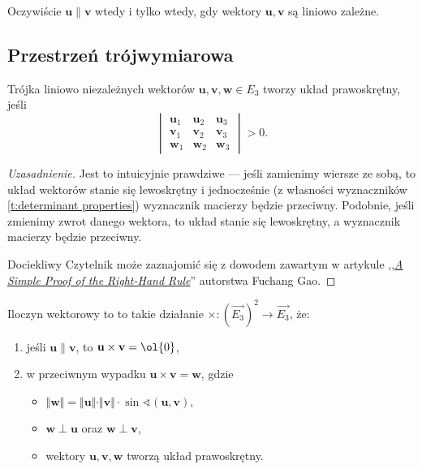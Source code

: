 Oczywiście $\mathbf{u} \parallel \mathbf{v}$ wtedy i tylko wtedy, gdy wektory $\mathbf{u}, \mathbf{v}$ są liniowo zależne.

\subsection{Przestrzeń trójwymiarowa}
\begin{fact}
    Trójka liniowo niezależnych wektorów $\mathbf{u}, \mathbf{v}, \mathbf{w} \in E_3$ tworzy układ prawoskrętny, jeśli
    \[ \begin{vmatrix}
        \mathbf{u}_1 & \mathbf{u}_2 & \mathbf{u}_3 \\
        \mathbf{v}_1 & \mathbf{v}_2 & \mathbf{v}_3 \\
        \mathbf{w}_1 & \mathbf{w}_2 & \mathbf{w}_3
    \end{vmatrix} > 0. \]
\end{fact}
\begin{proof}[Uzasadnienie]
    Jest to intuicyjnie prawdziwe --- jeśli zamienimy wiersze ze sobą, to układ wektorów stanie się lewoskrętny i jednocześnie (z własności wyznaczników \ref{t:determinant properties}) wyznacznik macierzy będzie przeciwny. Podobnie, jeśli zmienimy zwrot danego wektora, to układ stanie się lewoskrętny, a wyznacznik macierzy będzie przeciwny.

    Dociekliwy Czytelnik może zaznajomić się z dowodem zawartym w artykule ,,\textit{\href{https://sites.math.washington.edu/~marshall/math_136/right-hand-rule.pdf}{A Simple Proof of the Right-Hand Rule}}'' autorstwa Fuchang Gao.
\end{proof}

\begin{definition}
    \label{d:cross product}
    Iloczyn wektorowy to to takie działanie $\times : (\overrightarrow{E_3})^2 \to \overrightarrow{E_3}$, że:
    \begin{enumerate}
        \item jeśli $\mathbf{u} \parallel \mathbf{v}$, to $\mathbf{u} \times \mathbf{v} = \ol{0}$,
        \item w przeciwnym wypadku $\mathbf{u} \times \mathbf{v} = \mathbf{w}$, gdzie
            \begin{itemize}
                \item $\Vert\mathbf{w}\Vert = \Vert\mathbf{u}\Vert \cdot \Vert\mathbf{v}\Vert\cdot\sin\sphericalangle(\mathbf{u}, \mathbf{v})$,
                \item $\mathbf{w} \perp \mathbf{u}$ oraz $\mathbf{w} \perp \mathbf{v}$,
                \item wektory $\mathbf{u}, \mathbf{v}, \mathbf{w}$ tworzą układ prawoskrętny.
            \end{itemize}
    \end{enumerate}
\end{definition}

